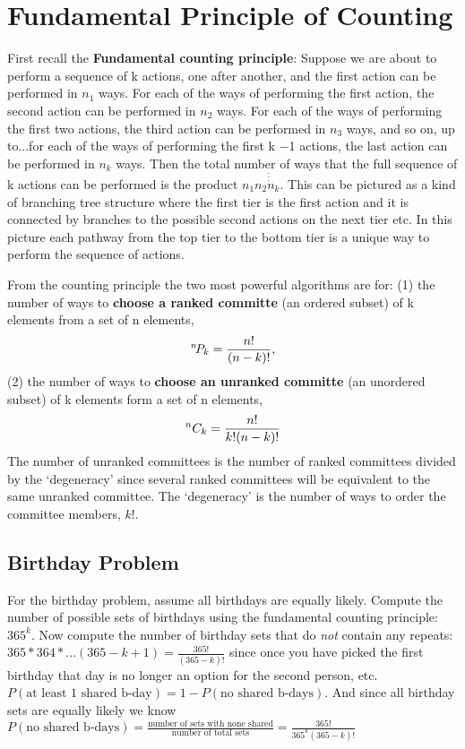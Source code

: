 \tableofcontents
\section{Fundamental Principle of Counting}

First recall the \textbf{Fundamental counting principle}: Suppose we are about to perform a sequence of k actions, one after another, and the first action can be performed in $n_1$ ways. For each of the ways of performing the first action, the second action can be performed in $n_2$ ways. For each of the ways of performing the first two actions, the third action can be performed in $n_3$ ways, and so on, up to...for each of the ways of performing the first k −1 actions, the last action can be performed in $n_k$ ways. Then the total number of ways that the full sequence of k actions can be performed is the product $n_1n_2\dot\dot\dot n_k$. This can be pictured as a kind of branching tree structure where the first tier is the first action and it is connected by branches to the possible second actions on the next tier etc. In this picture each pathway from the top tier to the bottom tier is a unique way to perform the sequence of actions.
\nn

From the counting principle the two most powerful algorithms are for:\newline
(1) the number of ways to \textbf{choose a ranked committe} (an ordered subset) of k elements from a set of n elements,
\begin{equation}
{}^{n}\!P_{k} = \frac{n!}{(n-k)!},
\end{equation}
\newline
(2) the number of ways to \textbf{choose an unranked committe} (an unordered subset) of k elements form a set of n elements,
\begin{equation}
{}^{n}C_{k} = \frac{n!}{k!(n-k)!}
\end{equation}
The number of unranked committees is the number of ranked committees divided by the `degeneracy' since several ranked committees will be equivalent to the same unranked committee.  The `degeneracy' is the number of ways to order the committee members, $k!$.
\newline\newline

\subsection{Birthday Problem}
For the birthday problem, assume all birthdays are equally likely.  Compute the number of possible sets of birthdays using the fundamental counting principle: $365^k$.  Now compute the number of birthday sets that do \textit{not} contain any repeats: $365*364*...(365-k+1)=\frac{365!}{(365-k)!}$ since once you have picked the first birthday that day is no longer an option for the second person, etc. $P(\textrm{at least 1 shared b-day}) = 1 - P(\textrm{no shared b-days})$. And since all birthday sets are equally likely we know $P(\textrm{no shared b-days}) = \frac{\textrm{number of sets with none shared}}{\textrm{number of total sets}}=\frac{365!}{365^k(365-k)!}$
\newline\newline

